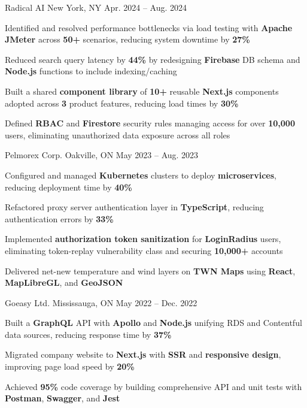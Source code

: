 \documentclass[11pt, a4paper]{awesome-cv}
\begin{document}
\begin{cventries}
  \cventry
    {\color{lightblue}{SOFTWARE ENGINEER INTERN}}
    {Radical AI}
    {New York, NY}
    {Apr. 2024 -- Aug. 2024}
    {
      \begin{cvitems}
        \item{Identified and resolved performance bottlenecks via load testing with \textbf{Apache JMeter} across \textbf{50+} scenarios, reducing system downtime by \textbf{27\%}}
        \item{Reduced search query latency by \textbf{44\%} by redesigning \textbf{Firebase} DB schema and \textbf{Node.js} functions to include indexing/caching}
        \item{Built a shared \textbf{component library} of \textbf{10+} reusable \textbf{Next.js} components adopted across \textbf{3} product features, reducing load times by \textbf{30\%}}
        \item{Defined \textbf{RBAC} and \textbf{Firestore} security rules managing access for over \textbf{10,000} users, eliminating unauthorized data exposure across all roles}
      \end{cvitems}
    }

  \vspace{3mm}

  \cventry
    {\color{lightblue}{SOFTWARE ENGINEER INTERN}}
    {Pelmorex Corp.}
    {Oakville, ON}
    {May 2023 -- Aug. 2023}
    {
      \begin{cvitems}
        \item{Configured and managed \textbf{Kubernetes} clusters to deploy \textbf{microservices}, reducing deployment time by \textbf{40\%}}
        \item{Refactored proxy server authentication layer in \textbf{TypeScript}, reducing authentication errors by \textbf{33\%}}
        \item{Implemented \textbf{authorization token sanitization} for \textbf{LoginRadius} users, eliminating token-replay vulnerability class and securing \textbf{10,000+} accounts}
        \item{Delivered net-new temperature and wind layers on \textbf{TWN Maps} using \textbf{React}, \textbf{MapLibreGL}, and \textbf{GeoJSON}}
      \end{cvitems}
    }

  \vspace{3mm}

  \cventry
    {\color{lightblue}{FRONT-END DEVELOPER INTERN}}
    {Goeasy Ltd.}
    {Mississauga, ON}
    {May 2022 -- Dec. 2022}
    {
      \begin{cvitems}
        \item{Built a \textbf{GraphQL} API with \textbf{Apollo} and \textbf{Node.js} unifying RDS and Contentful data sources, reducing response time by \textbf{37\%}}
        \item{Migrated company website to \textbf{Next.js} with \textbf{SSR} and \textbf{responsive design}, improving page load speed by \textbf{20\%}}
        \item{Achieved \textbf{95\%} code coverage by building comprehensive API and unit tests with \textbf{Postman}, \textbf{Swagger}, and \textbf{Jest}}
      \end{cvitems}
    }


\end{cventries}
\end{document}
